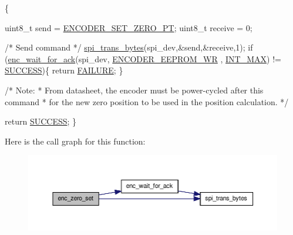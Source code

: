 \begin{DoxyCode}
                             \{

    uint8\_t send = \hyperlink{encoder__functions_8h_aa2fec4e0eb5a7b3668158a57952b9dbe}{ENCODER\_SET\_ZERO\_PT};
    uint8\_t receive = 0;
    
    \textcolor{comment}{/* Send command */}
    \hyperlink{spi__functions_8c_a3ae450d2b3ece27bb6036f811a7625a9}{spi\_trans\_bytes}(spi\_dev,&send,&receive,1);
    \textcolor{keywordflow}{if} (\hyperlink{group__enc_gad82fb44f2e735628ec95e003e4a1f93c}{enc\_wait\_for\_ack}(spi\_dev, \hyperlink{encoder__functions_8h_ab815abd4b9b825c60dbb04aad0d0e846}{ENCODER\_EEPROM\_WR}
      , \hyperlink{encoder__functions_8h_a9ec306f36d50c7375e74f0d1c55a3a67}{INT\_MAX}) != \hyperlink{calibration_2calibration_8h_aa90cac659d18e8ef6294c7ae337f6b58}{SUCCESS})\{ 
        \textcolor{keywordflow}{return} \hyperlink{calibration_2calibration_8h_a6d58f9ac447476b4e084d7ca383f5183}{FAILURE};
    \}

    \textcolor{comment}{/* Note: }
\textcolor{comment}{     *   From datasheet, the encoder must be power-cycled after this command}
\textcolor{comment}{     *   for the new zero position to be used in the position calculation. */}

    \textcolor{keywordflow}{return} \hyperlink{calibration_2calibration_8h_aa90cac659d18e8ef6294c7ae337f6b58}{SUCCESS};
\}
\end{DoxyCode}


Here is the call graph for this function\-:
\nopagebreak
\begin{figure}[H]
\begin{center}
\leavevmode
\includegraphics[width=350pt]{group__enc_gaebbe7b9d3c2571f7481cefacbe36c498_cgraph}
\end{center}
\end{figure}


